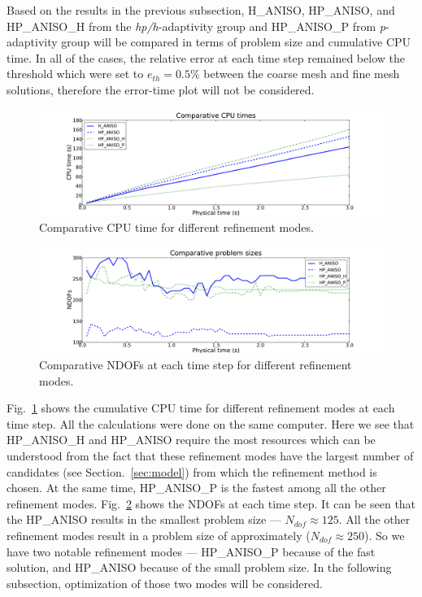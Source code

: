 Based on the results in the previous subsection, H\_ANISO, HP\_ANISO,
and HP\_ANISO\_H from the \emph{hp/h}-adaptivity group and HP\_ANISO\_P
from \emph{p}-adaptivity group will be compared
in terms of problem size and cumulative CPU time. 
In all of the cases, the relative 
error at each time step remained below
the threshold which were set to $e_{th}=0.5\%$ between the coarse mesh
and fine mesh solutions, therefore the error-time plot will not be considered.

\begin{figure}[!ht]
  \begin{centering}
  \includegraphics[width=\columnwidth]{cpu}
  \caption{\label{fig:cpu} Comparative CPU time for different refinement modes.}
  \end{centering}
\end{figure}

\begin{figure}[!ht]
  \begin{centering}
  \includegraphics[width=\columnwidth]{dof}
  \caption{\label{fig:dof} Comparative NDOFs at each time step for 
  different refinement modes.}
  \end{centering}
\end{figure}

Fig.~\ref{fig:cpu} shows the cumulative CPU time for different refinement 
modes at each time step. All the calculations were done on the same computer.
Here we see that HP\_ANISO\_H and HP\_ANISO require the most
resources which can be understood from the fact that these 
refinement modes have the largest number of 
candidates (see Section.~\ref{sec:model}) from which the refinement method is chosen.
At the same time, HP\_ANISO\_P is the fastest among all the other refinement modes.
Fig.~\ref{fig:dof} shows the NDOFs at each time step.
It can be seen that the HP\_ANISO results in the 
smallest problem size --- $N_{dof} \approx 125$. 
All the other refinement modes result in a 
problem size of approximately ($N_{dof} \approx 250$). So we have
two notable refinement modes --- HP\_ANISO\_P because of the fast
solution, and HP\_ANISO because of the small problem size. In the following
subsection, optimization of those two modes will be considered.


